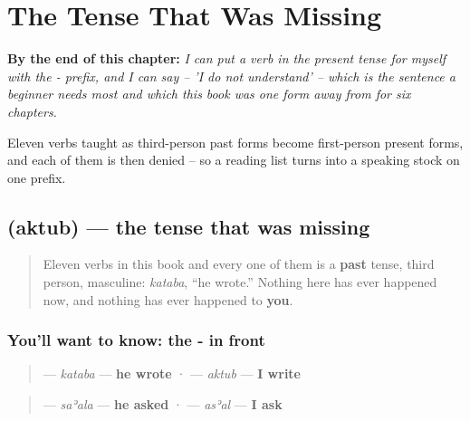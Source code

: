 
\chapter{The Tense That Was Missing}
\label{ch:ar-the-tense-that-was-missing}

\begin{chapteropening}
\textbf{By the end of this chapter:} \emph{I can put a verb in the present tense for myself with the - prefix, and I can say   -- 'I do not understand' -- which is the sentence a beginner needs most and which this book was one form away from for six chapters.}

Eleven verbs taught as third-person past forms become first-person present forms, and each of them is then denied -- so a reading list turns into a speaking stock on one prefix.
\end{chapteropening}

\section[\texorpdfstring{\ar{أكتب} (aktub)}{أكتب (aktub)}]{ (aktub) — the tense that was missing}

\label{lesson:AR-C37-present}



\begin{quote}
Eleven verbs in this book and every one of them is a \textbf{past} tense, third person, masculine: \emph{kataba}, \textquotedblleft{}he wrote.\textquotedblright{} Nothing here has ever happened now, and nothing has ever happened to \textbf{you}.
\end{quote}

\subsection*{You'll want to know: the - in front}
\begin{quote}
\textbf{} — \emph{kataba} — \textbf{he wrote} · \textbf{} — \emph{aktub} — \textbf{I write}
\end{quote}

\begin{quote}
\textbf{} — \emph{saʾala} — \textbf{he asked} · \textbf{} — \emph{asʾal} — \textbf{I ask}
\end{quote}

